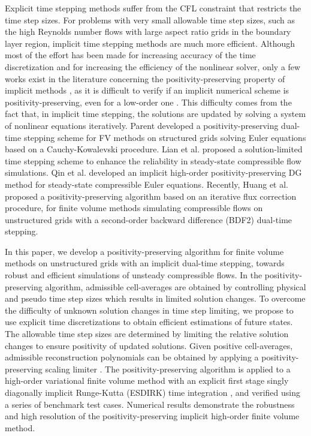Explicit time stepping methods suffer from the CFL constraint that restricts the time step sizes.
For problems with very small allowable time step sizes, such as the high Reynolds number flows with large aspect ratio grids in the boundary layer region,  implicit time stepping methods are much more efficient.
Although most of the effort has been made for increasing accuracy of the time discretization and for increasing the efficiency of the nonlinear solver, only a few works exist in the literature concerning the positivity-preserving property of implicit methods \cite{qin2018implicit}, as it is difficult to verify if an implicit numerical scheme is positivity-preserving, even for a low-order one \cite{huang2024general}. This difficulty comes from the fact that, in implicit time stepping, the solutions are updated by solving a system of nonlinear equations iteratively. Parent \cite{parent2018positivity} developed a positivity-preserving dual-time stepping scheme for FV methods on structured grids solving Euler equations based on a Cauchy-Kowalevski procedure. Lian et al. \cite{lian2009solution} proposed a solution-limited time stepping scheme to enhance the reliability in steady-state compressible flow simulations. Qin et al. \cite{qin2018implicit} developed an implicit high-order positivity-preserving DG method for steady-state compressible Euler equations. Recently, Huang et al. \cite{huang2024general} proposed a positivity-preserving algorithm based on an iterative flux correction procedure, for finite volume methods simulating compressible flows on unstructured grids with a second-order backward difference (BDF2) dual-time stepping.

In this paper, we develop a positivity-preserving algorithm for finite volume methods on unstructured grids with an implicit dual-time stepping, towards robust and efficient simulations of unsteady compressible flows.
In the positivity-preserving algorithm, admissible cell-averages are obtained by controlling physical and pseudo time step sizes which results in limited solution changes. To overcome the difficulty of unknown solution changes in time step limiting, we propose to use explicit time discretizations to obtain efficient estimations of future states. The allowable time step sizes are determined by limiting the relative solution changes to ensure positivity of updated solutions. Given positive cell-averages, admissible reconstruction polynomials can be obtained by applying a positivity-preserving scaling limiter \cite{zhang2010positivity}. The positivity-preserving algorithm is applied to a high-order variational finite volume method \cite{wang2017compact_VR} with an explicit first stage singly diagonally implicit Runge-Kutta (ESDIRK) time integration \cite{bijl2002implicitBDFvESDIRK}, and verified using a series of benchmark test cases. Numerical results demonstrate the robustness and high resolution of the positivity-preserving implicit high-order finite volume method.

